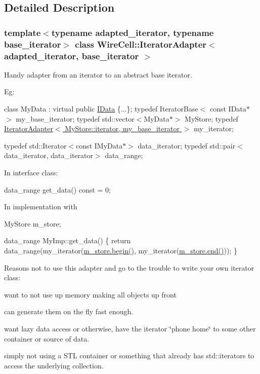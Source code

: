 \subsection{Detailed Description}
\subsubsection*{template$<$typename adapted\+\_\+iterator, typename base\+\_\+iterator$>$\newline
class Wire\+Cell\+::\+Iterator\+Adapter$<$ adapted\+\_\+iterator, base\+\_\+iterator $>$}

Handy adapter from an iterator to an abstract base iterator.

Eg\+:

class My\+Data \+: virtual public \hyperlink{class_wire_cell_1_1_i_data}{I\+Data} \{...\}; typedef Iterator\+Base$<$ const I\+Data$\ast$ $>$ my\+\_\+base\+\_\+iterator; typedef std\+::vector$<$\+My\+Data$\ast$$>$ My\+Store; typedef \hyperlink{class_wire_cell_1_1_iterator_adapter_af12e12abf4b3fb3745d53283313da519}{Iterator\+Adapter$<$ My\+Store\+::iterator, my\+\_\+base\+\_\+iterator $>$} my\+\_\+iterator;

typedef std\+::\+Iterator$<$const I\+My\+Data$\ast$$>$ data\+\_\+iterator; typedef std\+::pair$<$data\+\_\+iterator, data\+\_\+iterator$>$ data\+\_\+range;

In interface class\+:

data\+\_\+range get\+\_\+data() const = 0;

In implementation with

My\+Store m\+\_\+store;

data\+\_\+range My\+Imp\+::get\+\_\+data() \{ return data\+\_\+range(my\+\_\+iterator(\hyperlink{namespaceinternal_a265f36d9dee68d3f44381347ef2fd5cb}{m\+\_\+store.\+begin()}, my\+\_\+iterator(\hyperlink{namespaceinternal_a94820de1710dc8038fa6f188adfe299b}{m\+\_\+store.\+end()})); \}

Reasons not to use this adapter and go to the trouble to write your own iterator class\+:


\begin{DoxyItemize}
\item want to not use up memory making all objects up front
\item can generate them on the fly fast enough.
\item want lazy data access or otherwise, have the iterator \char`\"{}phone
home\char`\"{} to some other container or source of data.
\item simply not using a S\+TL container or something that already has std\+::iterators to access the underlying collection. 
\end{DoxyItemize}

